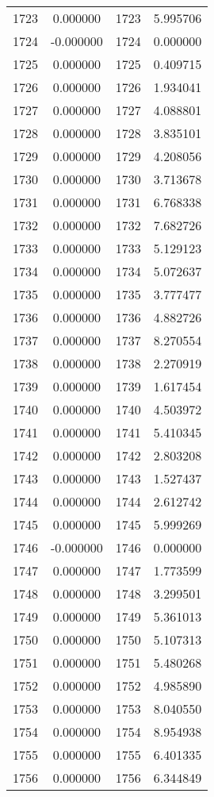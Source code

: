 \documentclass[12pt]{article}
\begin{document}
\begin{longtable}{@{}cccc@{}}
1723 & 0.000000 & 1723 & 5.995706 \\
1724 & -0.000000 & 1724 & 0.000000 \\
1725 & 0.000000 & 1725 & 0.409715 \\
1726 & 0.000000 & 1726 & 1.934041 \\
1727 & 0.000000 & 1727 & 4.088801 \\
1728 & 0.000000 & 1728 & 3.835101 \\
1729 & 0.000000 & 1729 & 4.208056 \\
1730 & 0.000000 & 1730 & 3.713678 \\
1731 & 0.000000 & 1731 & 6.768338 \\
1732 & 0.000000 & 1732 & 7.682726 \\
1733 & 0.000000 & 1733 & 5.129123 \\
1734 & 0.000000 & 1734 & 5.072637 \\
1735 & 0.000000 & 1735 & 3.777477 \\
1736 & 0.000000 & 1736 & 4.882726 \\
1737 & 0.000000 & 1737 & 8.270554 \\
1738 & 0.000000 & 1738 & 2.270919 \\
1739 & 0.000000 & 1739 & 1.617454 \\
1740 & 0.000000 & 1740 & 4.503972 \\
1741 & 0.000000 & 1741 & 5.410345 \\
1742 & 0.000000 & 1742 & 2.803208 \\
1743 & 0.000000 & 1743 & 1.527437 \\
1744 & 0.000000 & 1744 & 2.612742 \\
1745 & 0.000000 & 1745 & 5.999269 \\
1746 & -0.000000 & 1746 & 0.000000 \\
1747 & 0.000000 & 1747 & 1.773599 \\
1748 & 0.000000 & 1748 & 3.299501 \\
1749 & 0.000000 & 1749 & 5.361013 \\
1750 & 0.000000 & 1750 & 5.107313 \\
1751 & 0.000000 & 1751 & 5.480268 \\
1752 & 0.000000 & 1752 & 4.985890 \\
1753 & 0.000000 & 1753 & 8.040550 \\
1754 & 0.000000 & 1754 & 8.954938 \\
1755 & 0.000000 & 1755 & 6.401335 \\
1756 & 0.000000 & 1756 & 6.344849 \\

\end{longtable}
\end{document}
